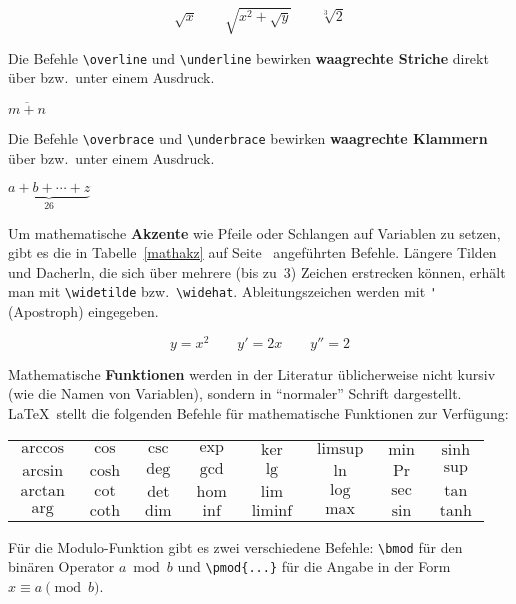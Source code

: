 \begin{LTXexample}
\[
\sqrt{x} \qquad  \sqrt{ x^{2}+\sqrt{y} }
   \qquad \sqrt[3]{2}
\]
\end{LTXexample}

Die Befehle \lstinline|\overline| und \lstinline|\underline| bewirken
\textbf{waagrechte Striche} direkt über bzw.\ unter einem
Ausdruck.
\begin{LTXexample}
$\overline{m+n}$
\end{LTXexample}

Die Befehle \lstinline|\overbrace| und \lstinline|\underbrace| bewirken
\textbf{waagrechte Klammern} über bzw.\ unter einem Ausdruck.

\begin{LTXexample}
$\underbrace{a+b+\cdots+z}_{26}$
\end{LTXexample}


Um mathematische \textbf{Akzente} wie Pfeile oder Schlangen auf
Variablen zu setzen, gibt es die in Tabelle~\ref{mathakz} auf
Seite~\pageref{mathakz} angeführten Befehle.
Längere Tilden und Dacherln, die sich über mehrere (bis zu~3)
Zeichen erstrecken können, erhält man mit \lstinline|\widetilde|
bzw.\ \lstinline|\widehat|.
Ableitungszeichen werden mit \lstinline|'| (Apostroph) eingegeben.

\begin{LTXexample}
\[
y=x^{2} \qquad y'=2x   \qquad y''=2
\]
\end{LTXexample}


Mathematische \textbf{Funktionen} werden in der Literatur
üblicherweise nicht kursiv (wie die Namen von Variablen),
sondern in "`normaler"' Schrift dargestellt.
\LaTeX\ stellt die folgenden Befehle für mathematische
Funktionen zur Verfügung:

\begin{LTXexample}[pos=b]
\begin{tabular}{@{}*{8}{>{$}c<{$}}@{}}
\arccos & \cos  & \csc & \exp & \ker    & \limsup & \min & \sinh \\
\arcsin & \cosh & \deg & \gcd & \lg     & \ln     & \Pr  & \sup  \\
\arctan & \cot  & \det & \hom & \lim    & \log    & \sec & \tan  \\
\arg   & \coth & \dim & \inf & \liminf & \max    & \sin & \tanh \\
\end{tabular}
\end{LTXexample}

Für die Modulo-Funktion gibt es zwei verschiedene Befehle:
\lstinline|\bmod| für den binären Operator \(a \bmod b\) und
\lstinline|\pmod{...}| für die Angabe in der Form \(x\equiv a
\pmod{b}\).

